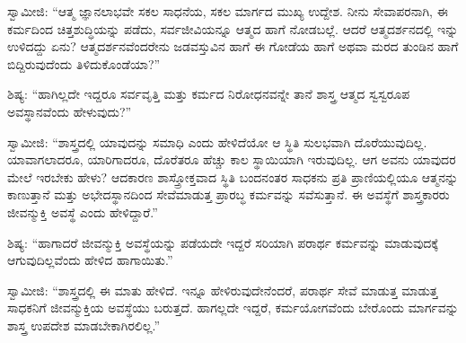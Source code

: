  ಸ್ವಾಮೀಜಿ: “ಆತ್ಮ ಜ್ಞಾನಲಾಭವೇ ಸಕಲ ಸಾಧನೆಯ, ಸಕಲ ಮಾರ್ಗದ ಮುಖ್ಯ ಉದ್ದೇಶ. ನೀನು ಸೇವಾಪರನಾಗಿ, ಈ ಕರ್ಮದಿಂದ ಚಿತ್ತಶುದ್ಧಿಯನ್ನು ಪಡೆದು, ಸರ್ವಜೀವಿಯನ್ನೂ ಆತ್ಮದ ಹಾಗೆ ನೋಡಬಲ್ಲೆ. ಆದರೆ ಆತ್ಮದರ್ಶನದಲ್ಲಿ ಇನ್ನು ಉಳಿದದ್ದು ಏನು? ಆತ್ಮದರ್ಶನವೆಂದರೇನು ಜಡವಸ್ತುವಿನ ಹಾಗೆ ಈ ಗೋಡೆಯ ಹಾಗೆ ಅಥವಾ ಮರದ ತುಂಡಿನ ಹಾಗೆ ಬಿದ್ದಿರುವುದೆಂದು ತಿಳಿದುಕೊಂಡೆಯಾ?” 

 ಶಿಷ್ಯ: “ಹಾಗಿಲ್ಲದೇ ಇದ್ದರೂ ಸರ್ವವೃತ್ತಿ ಮತ್ತು ಕರ್ಮದ ನಿರೋಧನವನ್ನೇ ತಾನೆ ಶಾಸ್ತ್ರ ಆತ್ಮದ ಸ್ವಸ್ವರೂಪ ಅವಸ್ಥಾನವೆಂದು ಹೇಳುವುದು?” 

 ಸ್ವಾಮೀಜಿ: “ಶಾಸ್ತ್ರದಲ್ಲಿ ಯಾವುದನ್ನು ಸಮಾಧಿ ಎಂದು ಹೇಳಿದೆಯೋ ಆ ಸ್ಥಿತಿ ಸುಲಭವಾಗಿ ದೊರೆಯುವುದಿಲ್ಲ. ಯಾವಾಗಲಾದರೂ, ಯಾರಿಗಾದರೂ, ದೊರೆತರೂ ಹೆಚ್ಚು ಕಾಲ ಸ್ಥಾಯಿಯಾಗಿ ಇರುವುದಿಲ್ಲ. ಆಗ ಅವನು ಯಾವುದರ ಮೇಲೆ ಇರಬೇಕು ಹೇಳು? ಆದಕಾರಣ ಶಾಸ್ತ್ರೋಕ್ತವಾದ ಸ್ಥಿತಿ ಬಂದನಂತರ ಸಾಧಕನು ಪ್ರತಿ ಪ್ರಾಣಿಯಲ್ಲಿಯೂ ಆತ್ಮನನ್ನು ಕಾಣುತ್ತಾನೆ ಮತ್ತು ಅಭೇದಸ್ಥಾನದಿಂದ ಸೇವೆಮಾಡುತ್ತ ಪ್ರಾರಬ್ಧ ಕರ್ಮವನ್ನು ಸವೆಸುತ್ತಾನೆ. ಈ ಅವಸ್ಥೆಗೆ ಶಾಸ್ತ್ರಕಾರರು ಜೀವನ್ಮುಕ್ತಿ ಅವಸ್ಥೆ ಎಂದು ಹೇಳಿದ್ದಾರೆ.” 

 ಶಿಷ್ಯ: “ಹಾಗಾದರೆ ಜೀವನ್ಮುಕ್ತಿ ಅವಸ್ಥೆಯನ್ನು ಪಡೆಯದೇ ಇದ್ದರೆ ಸರಿಯಾಗಿ ಪರಾರ್ಥ ಕರ್ಮವನ್ನು ಮಾಡುವುದಕ್ಕೆ ಆಗುವುದಿಲ್ಲವೆಂದು ಹೇಳಿದ ಹಾಗಾಯಿತು.” 

 ಸ್ವಾಮೀಜಿ: “ಶಾಸ್ತ್ರದಲ್ಲಿ ಈ ಮಾತು ಹೇಳಿದೆ. ಇನ್ನೂ ಹೇಳಿರುವುದೇನೆಂದರೆ, ಪರಾರ್ಥ ಸೇವೆ ಮಾಡುತ್ತ ಮಾಡುತ್ತ ಸಾಧಕನಿಗೆ ಜೀವನ್ಮುಕ್ತಿಯ ಅವಸ್ಥೆಯು ಬರುತ್ತದೆ. ಹಾಗಲ್ಲದೇ ಇದ್ದರೆ, ಕರ್ಮಯೋಗವೆಂದು ಬೇರೊಂದು ಮಾರ್ಗವನ್ನು ಶಾಸ್ತ್ರ ಉಪದೇಶ ಮಾಡಬೇಕಾಗಿರಲಿಲ್ಲ.” 

